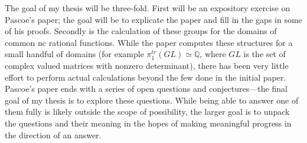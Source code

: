 \documentclass[11pt]{exam}
\newcommand{\QQ}{\mathbb{Q}}
\begin{document}
The goal of my thesis will be three-fold. First will be an expository exercise
on Pascoe's paper; the goal will be to explicate the paper and fill in the gaps
in some of his proofs. Secondly is the calculation of these groups for the
domains of common nc rational functions. While the paper computes these
structures for a small handful of domains (for example
\(\pi_1^{tr}(GL)\simeq \QQ \), where \(GL\) is the set of complex valued
matrices with nonzero determinant), there has been very little effort to perform
actual calculations beyond the few done in the initial paper. Pascoe's paper ends
with a series of open questions and conjectures---the final goal of my thesis is
to explore these questions.  While being able to answer one of them fully is
likely outside the scope of possibility, the larger goal is to unpack the
questions and their meaning in the hopes of making meaningful progress in the
direction of an answer.
\end{document}
